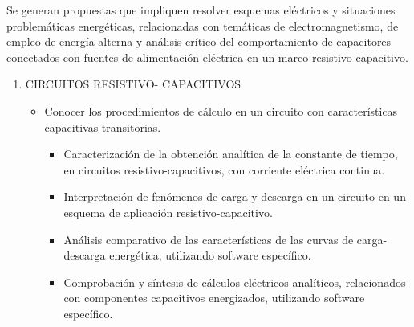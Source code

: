 \documentclass[../main]{subfiles}
\begin{document}
Se generan propuestas que impliquen resolver esquemas 
eléctricos y situaciones problemáticas energéticas, relacionadas con temáticas de electromagnetismo, de empleo de energía alterna y análisis crítico del comportamiento de capacitores conectados con fuentes de alimentación eléctrica en un marco resistivo-capacitivo. 
\begin{enumerate}
    \item CIRCUITOS RESISTIVO- CAPACITIVOS 
    \begin{itemize}
        \item Conocer los procedimientos de cálculo en un circuito con características capacitivas transitorias.
        \begin{itemize}
            \item Caracterización de la obtención analítica de la constante de tiempo, en circuitos resistivo-capacitivos, con corriente eléctrica continua. 
            \item Interpretación de fenómenos de carga y descarga en un circuito en un esquema de aplicación resistivo-capacitivo. 
            \item Análisis comparativo de las características de las curvas de carga-descarga energética, utilizando software específico. 
            \item Comprobación y síntesis de cálculos eléctricos analíticos, relacionados con componentes capacitivos energizados, utilizando software específico. 
        \end{itemize}
        

\end{itemize}
\end{enumerate}
\end{document}
